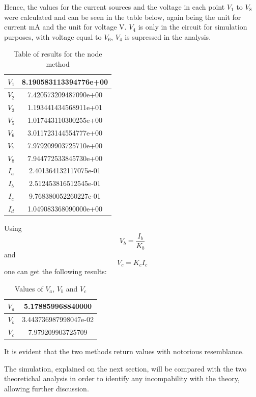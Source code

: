 \par Hence, the values for the current sources and the voltage in each point $V_1$ to $V_8$ were calculated and can be seen in the table below, again being the unit for current mA and the unit for voltage V. $V_4$ is only in the circuit for simulation purposes, with voltage equal to $V_6$, $V_4$ is supressed in the analysis.

\begin{table}[H]
    \centering
    \begin{tabular}{|c|c|}
    \hline
        $V_1$ & 8.190583113394776e+00\\ \hline
        $V_2$ & 7.420573209487090e+00\\ \hline
        $V_3$ & 1.193441434568911e+01\\ \hline
        $V_5$ & 1.017443110300255e+00\\ \hline
        $V_6$ & 3.011723144554777e+00\\ \hline
        $V_7$ & 7.979209903725710e+00\\ \hline
        $V_8$ & 7.944772533845730e+00\\ \hline
        $I_a$ & 2.401364132117075e-01\\ \hline 
        $I_b$ & 2.512453816512545e-01\\ \hline
        $I_c$ & 9.768380052260227e-01\\ \hline
        $I_d$ & 1.049083368090000e+00\\ \hline
    \end{tabular}
    \caption{Table of results for the node method}
    \label{results node}
\end{table}

\par Using
\begin{equation}
	V_b=\frac{I_b}{K_b}
\label{Vb}
\end{equation}
and
\begin{equation}
	V_c=K_{c}I_{c}
\end{equation}
one can get the following results:
\begin{table}[H]
    \centering
    \begin{tabular}{|c|c|}
    \hline
        $V_a$ & 5.178859968840000\\ \hline
        $V_b$ & 3.443736987998047e-02\\ \hline
        $V_c$ & 7.979209903725709\\ \hline
    \end{tabular}
    \caption{Values of $V_a$, $V_b$ and $V_c$}
\end{table}

\par It is evident that the two methods return values with notorious resemblance.

\par The simulation, explained on the next section, will be compared with the two theoretichal analysis in order to identify any incompability with the theory, allowing further discussion.
